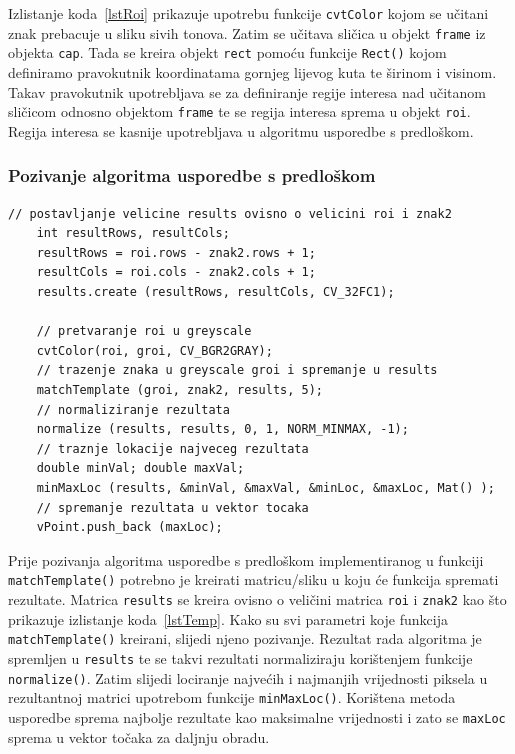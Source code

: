 Izlistanje koda~\ref{lstRoi} prikazuje upotrebu funkcije
\texttt{cvtColor} kojom se učitani znak prebacuje u sliku sivih tonova.
Zatim se učitava sličica u objekt \texttt{frame} iz objekta
\texttt{cap}. Tada se kreira objekt \texttt{rect} pomoću funkcije
\texttt{Rect()} kojom definiramo pravokutnik koordinatama gornjeg
lijevog kuta te širinom i visinom. Takav pravokutnik upotrebljava se za
definiranje regije interesa nad učitanom sličicom odnosno objektom
\texttt{frame} te se regija interesa sprema u objekt \texttt{roi}.
Regija interesa se kasnije upotrebljava u algoritmu usporedbe s
predloškom.


\newpage
\subsubsection{Pozivanje algoritma usporedbe s predloškom} %
\label{ssub:Pozivanje algoritma usporedbe s predloškom}

\begin{lstlisting}[label=lstTemp,caption={Izvorni kod pozivanja
algoritma usporedbe s predloškom}]
	// postavljanje velicine results ovisno o velicini roi i znak2
	int resultRows, resultCols;
	resultRows = roi.rows - znak2.rows + 1;
	resultCols = roi.cols - znak2.cols + 1;
	results.create (resultRows, resultCols, CV_32FC1);

    // pretvaranje roi u greyscale
    cvtColor(roi, groi, CV_BGR2GRAY);      
    // trazenje znaka u greyscale groi i spremanje u results
    matchTemplate (groi, znak2, results, 5);
    // normaliziranje rezultata
    normalize (results, results, 0, 1, NORM_MINMAX, -1);
    // traznje lokacije najveceg rezultata
    double minVal; double maxVal;
    minMaxLoc (results, &minVal, &maxVal, &minLoc, &maxLoc, Mat() );
    // spremanje rezultata u vektor tocaka
    vPoint.push_back (maxLoc);

\end{lstlisting}

Prije pozivanja algoritma usporedbe s predloškom implementiranog u
funkciji \texttt{matchTemplate()} potrebno je kreirati matricu/sliku u
koju će funkcija spremati rezultate. Matrica \texttt{results} se kreira
ovisno o veličini matrica \texttt{roi} i \texttt{znak2} kao što
prikazuje izlistanje koda~\ref{lstTemp}. Kako su svi parametri koje
funkcija \texttt{matchTemplate()} kreirani, slijedi njeno pozivanje.
Rezultat rada algoritma je spremljen u \texttt{results} te se takvi
rezultati normaliziraju korištenjem funkcije \texttt{normalize()}. Zatim
slijedi lociranje najvećih i najmanjih vrijednosti piksela u rezultantnoj
matrici upotrebom funkcije \texttt{minMaxLoc()}. Korištena metoda
usporedbe sprema najbolje rezultate kao maksimalne vrijednosti i zato se
\texttt{maxLoc} sprema u vektor točaka za daljnju obradu.




